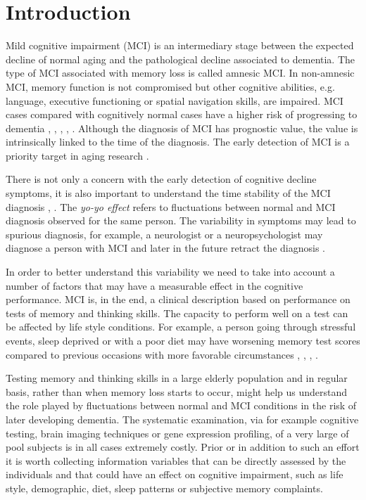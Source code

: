 \documentclass[preprint,12pt]{elsarticle}
\begin{document}
\section{Introduction}
\label{se:intro}

Mild cognitive impairment (MCI) is an intermediary stage between the expected decline of normal aging and the pathological decline associated to dementia. The type of MCI associated with memory loss is called amnesic MCI. In non-amnesic MCI, memory function is not compromised but other cognitive abilities, e.g. language, executive functioning or spatial navigation skills, are impaired. MCI cases  compared with cognitively normal cases have a higher risk of progressing to dementia \cite{flicker1991mild}, \cite{petersen1999mild}, \cite{bruscoli2004mci}, \cite{buratti2015markers}, \cite{michaud2017risk}. Although the diagnosis of MCI has prognostic value, the value is intrinsically linked to the time of the diagnosis. 
The early detection of MCI is a priority target in aging research \cite{prince2018world}.

There is not only a concern with the early detection of cognitive decline symptoms, it is also important to understand the time stability of the MCI diagnosis \cite{Han2012}, \cite{Ellendt2017}. The \emph{yo-yo effect} refers to fluctuations between normal and MCI diagnosis observed for the same person. The variability in symptoms may lead to spurious diagnosis, for example, a neurologist or a neuropsychologist may diagnose a person with MCI and later in the future retract the diagnosis \cite{Zonderman2013}. 

In order to better understand this variability we need to take into account a number of factors that may have a measurable effect in the cognitive performance. MCI is, in the end, a clinical description based on performance on tests of memory and thinking skills. The capacity to perform well on a test can be affected by life style conditions. For example, a person going through stressful events, sleep deprived or with a poor diet may have worsening memory test scores compared to previous occasions with more favorable circumstances \cite{vecsey2015effects}, \cite{loewenstein2018utilizing}, \cite{sandi2007stress}, \cite{neupert2006daily}.

Testing memory and thinking skills in a large elderly population and in regular basis, rather than when memory loss starts to occur, might help us understand the role played by fluctuations between normal and MCI conditions in the risk of later developing dementia. The systematic examination, via for example cognitive testing, brain imaging techniques or gene expression profiling, of a very large of pool subjects is in all cases extremely costly. Prior or in addition to such an effort it is worth collecting information variables that can be directly assessed by the individuals and that could have an effect on cognitive impairment, such as life style, demographic, diet, sleep patterns or subjective memory complaints. 
\end{document}
